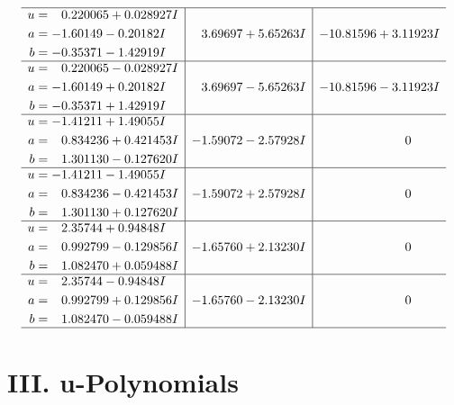 \documentclass[1p]{elsarticle_modified}
\theoremstyle{definition}
\begin{document}
$$\begin{array}{c|c|c}
 \hline 
\begin{aligned}
u &= \phantom{-}0.220065 + 0.028927 I \\
a &= -1.60149 - 0.20182 I \\
b &= -0.35371 - 1.42919 I\end{aligned}
 & \phantom{-}3.69697 + 5.65263 I & -10.81596 + 3.11923 I \\ \hline\begin{aligned}
u &= \phantom{-}0.220065 - 0.028927 I \\
a &= -1.60149 + 0.20182 I \\
b &= -0.35371 + 1.42919 I\end{aligned}
 & \phantom{-}3.69697 - 5.65263 I & -10.81596 - 3.11923 I \\ \hline\begin{aligned}
u &= -1.41211 + 1.49055 I \\
a &= \phantom{-}0.834236 + 0.421453 I \\
b &= \phantom{-}1.301130 - 0.127620 I\end{aligned}
 & -1.59072 - 2.57928 I & \phantom{-0.000000 } 0 \\ \hline\begin{aligned}
u &= -1.41211 - 1.49055 I \\
a &= \phantom{-}0.834236 - 0.421453 I \\
b &= \phantom{-}1.301130 + 0.127620 I\end{aligned}
 & -1.59072 + 2.57928 I & \phantom{-0.000000 } 0 \\ \hline\begin{aligned}
u &= \phantom{-}2.35744 + 0.94848 I \\
a &= \phantom{-}0.992799 - 0.129856 I \\
b &= \phantom{-}1.082470 + 0.059488 I\end{aligned}
 & -1.65760 + 2.13230 I & \phantom{-0.000000 } 0 \\ \hline\begin{aligned}
u &= \phantom{-}2.35744 - 0.94848 I \\
a &= \phantom{-}0.992799 + 0.129856 I \\
b &= \phantom{-}1.082470 - 0.059488 I\end{aligned}
 & -1.65760 - 2.13230 I & \phantom{-0.000000 } 0\\
 \hline 
 \end{array}$$\newpage
\newpage\renewcommand{\arraystretch}{1}
\centering \section*{ III. u-Polynomials}
\end{document}
